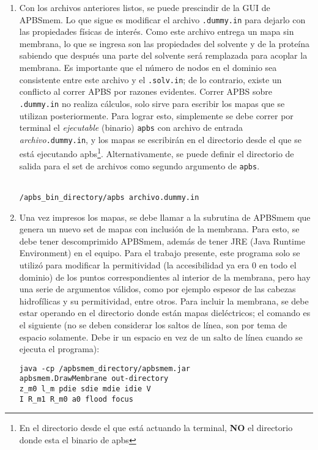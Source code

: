 \begin{enumerate}
	\item Con los archivos anteriores listos, se puede prescindir de la GUI de APBSmem. Lo que sigue es modificar el archivo \texttt{.dummy.in} para dejarlo con las propiedades físicas de interés. Como este archivo entrega un mapa sin membrana, lo que se ingresa son las propiedades del solvente y de la proteína sabiendo que después una parte del solvente será remplazada para acoplar la membrana. Es importante que el número de nodos en el dominio sea consistente entre este archivo y el \texttt{.solv.in}; de lo contrario, existe un conflicto al correr APBS por razones evidentes. Correr APBS sobre \texttt{.dummy.in} no realiza cálculos, solo sirve para escribir los mapas que se utilizan posteriormente. Para lograr esto, simplemente se debe correr por terminal el \textit{ejecutable} (binario) \texttt{apbs} con archivo de entrada \textit{archivo}\texttt{.dummy.in}, y los mapas se escribirán en el directorio desde el que se está ejecutando apbs\footnote{En el directorio desde el que está actuando la terminal, \textbf{NO} el directorio donde esta el binario de apbs}. Alternativamente, se puede definir el directorio de salida para el set de archivos como segundo argumento de \texttt{apbs}.\\\\
	\begin{lstlisting}
/apbs_bin_directory/apbs archivo.dummy.in
	\end{lstlisting}
	\item Una vez impresos los mapas, se debe llamar a la subrutina de APBSmem que genera un nuevo set de mapas con inclusión de la membrana. Para esto, se debe tener descomprimido APBSmem, además de tener JRE (Java Runtime Environment) en el equipo. Para el trabajo presente, este programa solo se utilizó para modificar la permitividad (la accesibilidad ya era $0$ en todo el dominio) de los puntos correspondientes al interior de la membrana, pero hay una serie de argumentos válidos, como por ejemplo espesor de las cabezas hidrofílicas y su permitividad, entre otros. Para incluir la membrana, se debe estar operando en el directorio donde están mapas dieléctricos; el comando es el siguiente (no se deben considerar los saltos de línea, son por tema de espacio solamente. Debe ir un espacio en vez de un salto de línea cuando se ejecuta el programa):
	\begin{lstlisting}
java -cp /apbsmem_directory/apbsmem.jar
apbsmem.DrawMembrane out-directory
z_m0 l_m pdie sdie mdie idie V
I R_m1 R_m0 a0 flood focus
	\end{lstlisting}

\end{enumerate}
